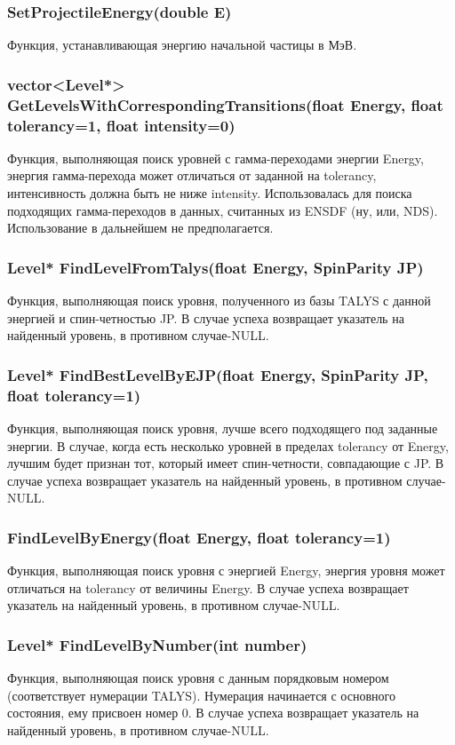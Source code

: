\documentclass[a4paper,12pt]{extarticle}
\begin{document}
\subsubsection{SetProjectileEnergy(double E)}
Функция, устанавливающая энергию начальной частицы в МэВ.
\subsubsection{vector<Level*> GetLevelsWithCorrespondingTransitions(float Energy, float tolerancy=1, float intensity=0)}
Функция, выполняющая поиск уровней с гамма-переходами энергии Energy, энергия гамма-перехода может отличаться от заданной на tolerancy, интенсивность должна быть не ниже intensity. Использовалась для поиска подходящих гамма-переходов в данных, считанных из ENSDF (ну, или, NDS). Использование в дальнейшем не предполагается.
\subsubsection{Level* FindLevelFromTalys(float Energy, SpinParity JP)}
Функция, выполняющая поиск уровня, полученного из базы TALYS с данной энергией и спин-четностью JP. В случае успеха возвращает указатель на найденный уровень, в противном случае-NULL.
\subsubsection{Level* FindBestLevelByEJP(float Energy, SpinParity JP, float tolerancy=1)}
Функция, выполняющая поиск уровня, лучше всего подходящего под заданные энергии. В случае, когда есть несколько уровней в пределах tolerancy от Energy, лучшим будет признан тот, который имеет спин-четности, совпадающие с JP. В случае успеха возвращает указатель на найденный уровень, в противном случае-NULL.
\subsubsection{FindLevelByEnergy(float Energy, float tolerancy=1)}
Функция, выполняющая поиск уровня с энергией Energy, энергия уровня может отличаться на tolerancy от величины Energy. В случае успеха возвращает указатель на найденный уровень, в противном случае-NULL.
\subsubsection{Level* FindLevelByNumber(int number)}
Функция, выполняющая поиск уровня с данным порядковым номером (соответствует нумерации TALYS). Нумерация начинается с основного состояния, ему присвоен номер 0. В случае успеха возвращает указатель на найденный уровень, в противном случае-NULL.
\end{document}
